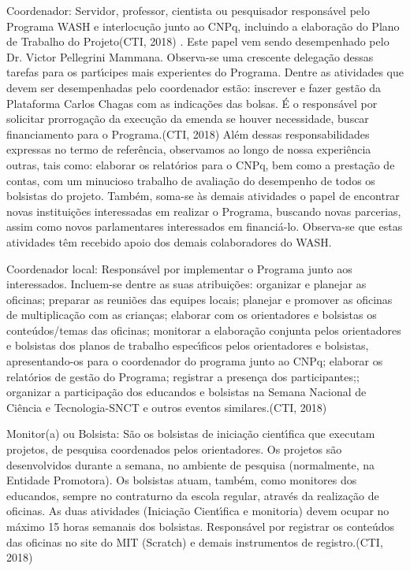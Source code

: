 \documentclass[
12pt,		%
openright,	%
twoside,  %
a4paper,			%
chapter=TITLE,		%
english,			%
french,				%
spanish,			%
brazil				%
]{USPSC-classe/USPSC}
\begin{document}
\begin{alineas}
\item Coordenador: \textquotedbl Servidor, professor, cientista ou pesquisador respons\'avel pelo Programa WASH e interlocu\c{c}\~ao junto ao CNPq, incluindo a elabora\c{c}\~ao do Plano de Trabalho do Projeto\textquotedbl   (CTI, 2018) . Este papel vem sendo desempenhado pelo Dr. Victor Pellegrini Mammana. Observa-se uma crescente delega\c{c}\~ao dessas tarefas para os part\'{\i}cipes mais experientes do Programa. Dentre as atividades que devem ser desempenhadas pelo coordenador est\~ao: \textquotedbl inscrever e fazer gest\~ao da Plataforma Carlos Chagas com as indica\c{c}\~oes das bolsas. \'E o respons\'avel por solicitar prorroga\c{c}\~ao da execu\c{c}\~ao da emenda se houver necessidade, buscar financiamento para o Programa.\textquotedbl   (CTI, 2018) Al\'em dessas responsabilidades expressas no termo de refer\^encia, observamos ao longo de nossa experi\^encia outras, tais como: elaborar os relat\'orios para o CNPq, bem como a presta\c{c}\~ao de contas, com um minucioso trabalho de avalia\c{c}\~ao do desempenho de todos os bolsistas do projeto. Tamb\'em, soma-se \`as demais atividades o papel de encontrar novas institui\c{c}\~oes interessadas em realizar o Programa, buscando novas parcerias, assim como novos parlamentares interessados em financi\'a-lo. Observa-se que estas atividades t\^em recebido apoio dos demais colaboradores do WASH.
\item Coordenador local: \textquotedbl Respons\'avel por implementar o Programa junto aos interessados. Incluem-se dentre as suas atribui\c{c}\~oes: organizar e planejar as oficinas; preparar as reuni\~oes das equipes locais; planejar e promover as oficinas de multiplica\c{c}\~ao com as crian\c{c}as; elaborar com os orientadores e bolsistas os conte\'udos/temas das oficinas; monitorar a elabora\c{c}\~ao conjunta pelos orientadores e bolsistas dos planos de trabalho espec\'{\i}ficos pelos orientadores e bolsistas, apresentando-os para o coordenador do programa junto ao CNPq; elaborar os relat\'orios de gest\~ao do Programa; registrar a presen\c{c}a dos participantes;; organizar a participa\c{c}\~ao dos educandos e bolsistas na Semana Nacional de Ci\^encia e Tecnologia-SNCT e outros eventos similares.\textquotedbl   (CTI, 2018)
\item Monitor(a) ou Bolsista: \textquotedbl  S\~ao os bolsistas de inicia\c{c}\~ao cient\'{\i}fica que executam projetos, de pesquisa coordenados pelos orientadores. Os projetos s\~ao desenvolvidos durante a semana, no ambiente de pesquisa (normalmente, na Entidade Promotora). Os bolsistas atuam, tamb\'em, como monitores dos educandos, sempre no contraturno da escola regular, atrav\'es da realiza\c{c}\~ao de oficinas. As duas atividades (Inicia\c{c}\~ao Cient\'{\i}fica e monitoria) devem ocupar no m\'aximo 15 horas semanais dos bolsistas. Respons\'avel por registrar os conte\'udos das oficinas no site do MIT (Scratch) e demais instrumentos de registro.\textquotedbl   (CTI, 2018)

\end{alineas}
\end{document}
